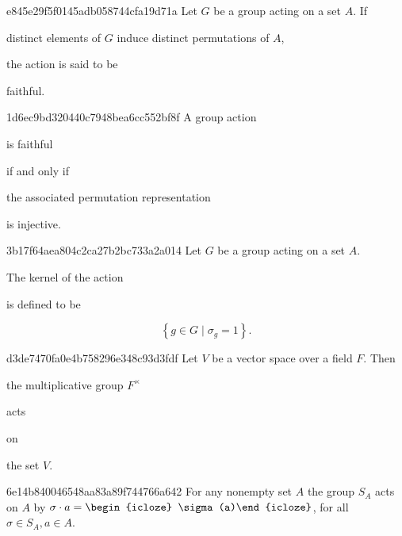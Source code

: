 \begin{note}{e845e29f5f0145adb058744cfa19d71a}
    Let \({ G }\) be a group acting on a set \({ A }\).
    If \begin{icloze}{2}distinct elements of \({ G }\) induce distinct permutations of \({ A }\),\end{icloze} the action is said to be \begin{icloze}{1}faithful.\end{icloze}
\end{note}

\begin{note}{1d6ec9bd320440c7948bea6cc552bf8f}
    A group action \begin{icloze}{3}is faithful\end{icloze} \begin{icloze}{4}if and only if\end{icloze} \begin{icloze}{2}the associated permutation representation\end{icloze} \begin{icloze}{1}is injective.\end{icloze}
\end{note}

\begin{note}{3b17f64aea804c2ca27b2bc733a2a014}
    Let \({ G }\) be a group acting on a set \({ A }\).
    \begin{icloze}{2}The kernel of the action\end{icloze} is defined to be
    \begin{icloze}{1}
        \[
            \left\{ g \in G \mid \sigma_{g} = 1 \right\}.
        \]
    \end{icloze}
\end{note}

\begin{note}{d3de7470fa0e4b758296e348c93d3fdf}
    Let \({ V }\) be a vector space over a field \({ F }\).
    Then \begin{icloze}{2}the multiplicative group \({ F^{\times} }\)\end{icloze} \begin{icloze}{3}acts\end{icloze} on \begin{icloze}{1}the set \({ V }\).\end{icloze}
\end{note}

\begin{note}{6e14b840046548aa83a89f744766a642}
    For any nonempty set \({ A }\) the group \({ S_{A} }\) acts on \({ A }\) by \({ \sigma \cdot a = \begin{icloze}{1}\sigma(a)\end{icloze} }\), for all \({ \sigma \in S_{A}, a \in A }\).
\end{note}

